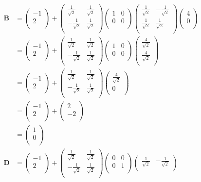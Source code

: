 \documentclass[12pt]{article}
\newcommand{\myvec}[1]{\ensuremath{\begin{pmatrix}#1\end{pmatrix}}}
\let\vec\mathbf
\begin{document}
\begin{align}
\vec{B} &= \myvec{
-1\\
2\\
}+\myvec{
\frac{1}{\sqrt{2}} & \frac{1}{\sqrt{2}} \\
-\frac{1}{\sqrt{2}} & \frac{1}{\sqrt{2}}\\
}\myvec{
 1&0\\
 0&0\\
}\myvec{
\frac{1}{\sqrt{2}} & -\frac{1}{\sqrt{2}} \\
\frac{1}{\sqrt{2}} & \frac{1}{\sqrt{2}}\\
}\myvec{
4\\
0\\
}\\
 &= \myvec{
-1\\
2\\
}+\myvec{
\frac{1}{\sqrt{2}} & \frac{1}{\sqrt{2}} \\
-\frac{1}{\sqrt{2}} & \frac{1}{\sqrt{2}}\\
}\myvec{
 1&0\\
 0&0\\
}\myvec{
\frac{4}{\sqrt{2}}\\
\frac{4}{\sqrt{2}}\\
}\\
 &= \myvec{
-1\\
2\\
}+\myvec{
\frac{1}{\sqrt{2}} & \frac{1}{\sqrt{2}} \\
-\frac{1}{\sqrt{2}} & \frac{1}{\sqrt{2}}\\
}\myvec{
\frac{4}{\sqrt{2}}\\
0\\
}\\
 &= \myvec{
-1\\
2\\
}+\myvec{
2\\
-2\\
}\\
 &= \myvec{
1\\
0\\
}\\
\vec{D} &= \myvec{
-1\\
2\\
}+\myvec{
\frac{1}{\sqrt{2}} & \frac{1}{\sqrt{2}} \\
-\frac{1}{\sqrt{2}} & \frac{1}{\sqrt{2}}\\
}\myvec{
 0&0\\
 0&1\\
}\myvec{
\frac{1}{\sqrt{2}} & -\frac{1}{\sqrt{2}} \\
}
\end{align}
\end{document}
